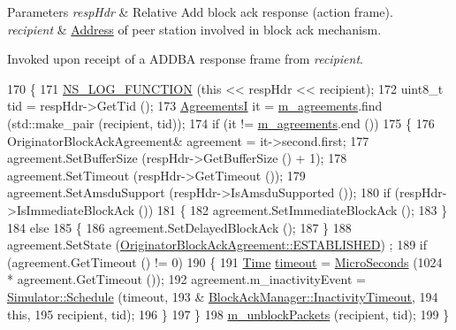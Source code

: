 \begin{DoxyParams}{Parameters}
{\em resp\+Hdr} & Relative Add block ack response (action frame). \\
\hline
{\em recipient} & \hyperlink{classns3_1_1Address}{Address} of peer station involved in block ack mechanism.\\
\hline
\end{DoxyParams}
Invoked upon receipt of a A\+D\+D\+BA response frame from {\itshape recipient}. 
\begin{DoxyCode}
170 \{
171   \hyperlink{log-macros-disabled_8h_a90b90d5bad1f39cb1b64923ea94c0761}{NS\_LOG\_FUNCTION} (\textcolor{keyword}{this} << respHdr << recipient);
172   uint8\_t tid = respHdr->GetTid ();
173   \hyperlink{classns3_1_1BlockAckManager_acbd1cf7c5f3487150955c3a4c9d04102}{AgreementsI} it = \hyperlink{classns3_1_1BlockAckManager_a952a6b8b29705c83ba6464f7cf7ffe66}{m\_agreements}.find (std::make\_pair (recipient, tid));
174   \textcolor{keywordflow}{if} (it != \hyperlink{classns3_1_1BlockAckManager_a952a6b8b29705c83ba6464f7cf7ffe66}{m\_agreements}.end ())
175     \{
176       OriginatorBlockAckAgreement& agreement = it->second.first;
177       agreement.SetBufferSize (respHdr->GetBufferSize () + 1);
178       agreement.SetTimeout (respHdr->GetTimeout ());
179       agreement.SetAmsduSupport (respHdr->IsAmsduSupported ());
180       \textcolor{keywordflow}{if} (respHdr->IsImmediateBlockAck ())
181         \{
182           agreement.SetImmediateBlockAck ();
183         \}
184       \textcolor{keywordflow}{else}
185         \{
186           agreement.SetDelayedBlockAck ();
187         \}
188       agreement.SetState (\hyperlink{classns3_1_1OriginatorBlockAckAgreement_ab33ae8af8c458aca7437a472778e4761a341f78e1e094b88dea42e94b32871067}{OriginatorBlockAckAgreement::ESTABLISHED})
      ;
189       \textcolor{keywordflow}{if} (agreement.GetTimeout () != 0)
190         \{
191           \hyperlink{namespacens3_1_1TracedValueCallback_a7ffd3e7c142ffe7c8a1d2db9b8de38ec}{Time} \hyperlink{openflow-switch_8cc_a386d174ae121d1cfa279074b7e209714}{timeout} = \hyperlink{group__timecivil_ga17465a639c8d1464e76538afdd78a9f0}{MicroSeconds} (1024 * agreement.GetTimeout ());
192           agreement.m\_inactivityEvent = \hyperlink{classns3_1_1Simulator_a671882c894a08af4a5e91181bf1eec13}{Simulator::Schedule} (timeout,
193                                                              &
      \hyperlink{classns3_1_1BlockAckManager_a7846b31a39f8e2c3302020e4c66ae31f}{BlockAckManager::InactivityTimeout},
194                                                              \textcolor{keyword}{this},
195                                                              recipient, tid);
196         \}
197     \}
198   \hyperlink{classns3_1_1BlockAckManager_a1ac5899b37bf2ffee1814cefebe8fe29}{m\_unblockPackets} (recipient, tid);
199 \}
\end{DoxyCode}


